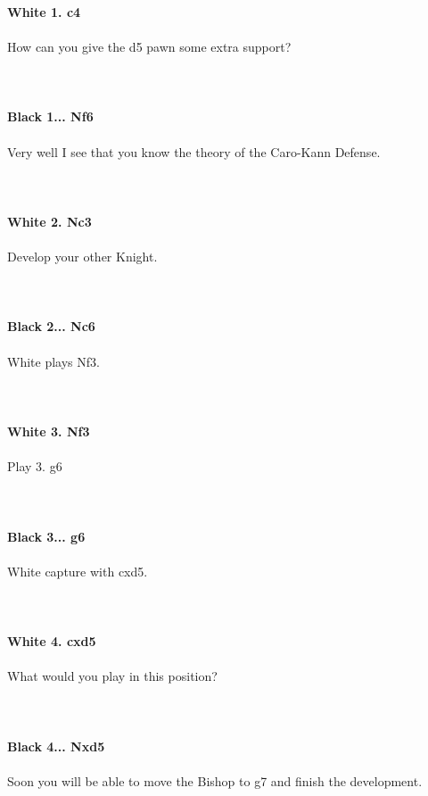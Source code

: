 \documentclass{article}
\begin{document}
\\

\\
\\
\textbf{White 1. c4}\\
\\
How can you give the d5 pawn some extra support?\\
\\

\\
\\
\textbf{Black 1... Nf6}\\
\\
Very well I see that you know the theory of the Caro-Kann Defense.\\
\\

\\
\\
\textbf{White 2. Nc3}\\
\\
Develop your other Knight.\\
\\

\\
\\
\textbf{Black 2... Nc6}\\
\\
White plays Nf3.\\
\\

\\
\\
\textbf{White 3. Nf3}\\
\\
Play 3. g6\\
\\

\\
\\
\textbf{Black 3... g6}\\
\\
White capture with cxd5.\\
\\

\\
\\
\textbf{White 4. cxd5}\\
\\
What would you play in this position?\\
\\

\\
\\
\textbf{Black 4... Nxd5}\\
\\
Soon you will be able to move the Bishop to g7 and finish the development.
\end{document}

